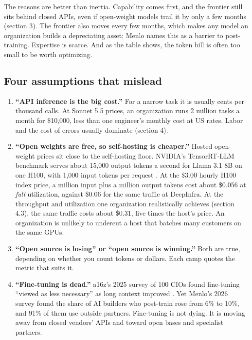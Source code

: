 The reasons are better than inertia. Capability comes first, and the frontier still sits behind closed APIs, even if open-weight models trail it by only a few months (section 3). The frontier also moves every few months, which makes any model an organization builds a depreciating asset; Menlo names this as a barrier to post-training. Expertise is scarce. And as the table shows, the token bill is often too small to be worth optimizing.

\subsection{Four assumptions that mislead}

\begin{enumerate}
\def\labelenumi{\arabic{enumi}.}
\tightlist
\item
  \textbf{``API inference is the big cost.''} For a narrow task it is usually cents per thousand calls.  At Sonnet 5.5 prices, an organization runs 2 million tasks a month for \$10,000, less than one engineer's monthly cost at US rates. Labor and the cost of errors usually dominate (section 4).
\item
  \textbf{``Open weights are free, so self-hosting is cheaper.''} Hosted open-weight prices sit close to the self-hosting floor.  NVIDIA's TensorRT-LLM benchmark serves about 15,000 output tokens a second for Llama 3.1 8B on one H100, with 1,000 input tokens per request \citep{nvidia2026trtllm}. At the \$3.00 hourly H100 index price, a million input plus a million output tokens cost about \$0.056 at \emph{full} utilization, against \$0.06 for the same traffic at DeepInfra. At the throughput and utilization one organization realistically achieves (section 4.3), the same traffic costs about \$0.31, five times the host's price. An organization is unlikely to undercut a host that batches many customers on the same GPUs.
\item
  \textbf{``Open source is losing'' or ``open source is winning.''} Both are true, depending on whether you count tokens or dollars. Each camp quotes the metric that suits it.
\item
  \textbf{``Fine-tuning is dead.''} a16z's 2025 survey of 100 CIOs found fine-tuning ``viewed as less necessary'' as long context improved \citep{wang2025cio}. Yet Menlo's 2026 survey found the share of AI builders who post-train rose from 6\% to 10\%, and 91\% of them use outside partners.  Fine-tuning is not dying. It is moving away from closed vendors' APIs and toward open bases and specialist partners.
\end{enumerate}

